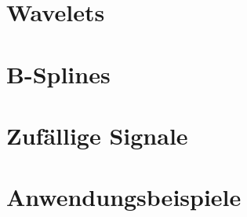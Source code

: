 \section{Wavelets}\label{wavelets}
%

%
%
\section{B-Splines}\label{bsplines}
%

%
%
\section{Zuf\"allige Signale}\label{random}
%

%
\section{Anwendungsbeispiele}\label{sec:applications}
%
%
%
%
%

